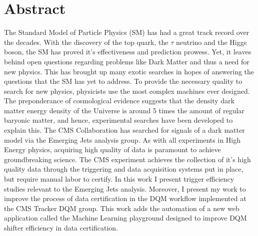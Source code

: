 \chapter{Abstract}

The Standard Model of Particle Physics (SM) has had a great track record over the decades. With the discovery of the top quark, the $\tau$ neutrino and the Higgs boson, the SM has proved it's effectiveness and prediction prowess. Yet, it leaves behind open questions regarding problems like Dark Matter and thus a need for new physics. This has brought up many exotic searches in hopes of answering the questions that the SM has yet to address.
To provide the necessary quality to search for new physics, physicists use the most complex machines ever designed.
The preponderance of cosmological evidence suggests that the density dark matter energy density of the Universe is around 5 times the amount of regular baryonic matter, and hence, experimental searches have been developed to explain this.
The CMS Collaboration has searched for signals of a dark matter model via the Emerging Jets analysis group.
As with all experiments in High Energy physics, acquiring high quality of data is paramount to achieve groundbreaking science. The CMS experiment achieves the collection of it's high quality data through the triggering and data acquisition systems put in place, but require manual labor to certify.
In this work I present trigger efficiency studies relevant to the Emerging Jets analysis. Moreover, I present my work
to improve the process of data certification in the DQM workflow implemented at the CMS Tracker DQM group. This work adds the automation of a new web application called the Machine Learning playground designed to improve DQM shifter efficiency in data certification.



